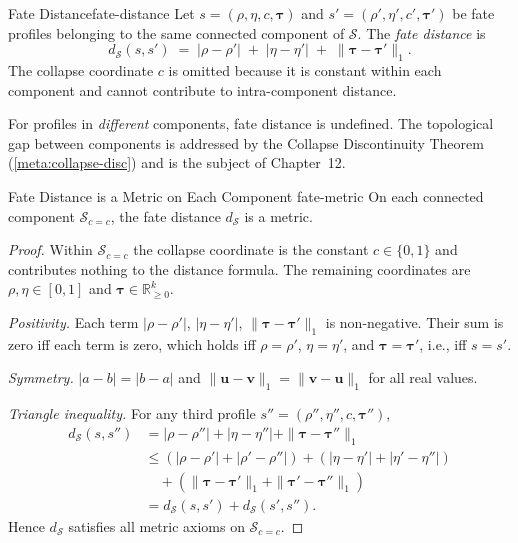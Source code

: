 \documentclass[12pt,twoside,openright]{book}
\newcommand{\fateSpace}{\mathcal{S}}
\newcommand{\survRatio}{\rho}             %
\newcommand{\repEff}{\eta}               %
\newcommand{\collapseInd}{c}             %
\newcommand{\fateDist}[2]{d_{\fateSpace}(#1,#2)}
\newcommand{\fateComp}[1]{\fateSpace_{\collapseInd=#1}}
\providecommand{\fateComp}[1]{\fateSpace_{\collapseInd=#1}}
\providecommand{\fateDist}[2]{d_{\fateSpace}(#1,#2)}
\begin{document}
\begin{definition}{Fate Distance}{fate-distance}
Let $s=(\survRatio,\repEff,\collapseInd,\boldsymbol{\tau})$ and
$s'=(\survRatio',\repEff',\collapseInd',\boldsymbol{\tau}')$ be
fate profiles belonging to the same connected component of
$\fateSpace$.
The \emph{fate distance} is
\[
  \fateDist{s}{s'}
  \;=\;
  |\survRatio-\survRatio'|
  \;+\;
  |\repEff-\repEff'|
  \;+\;
  \|\boldsymbol{\tau}-\boldsymbol{\tau}'\|_{1}.
\]
The collapse coordinate $\collapseInd$ is omitted because it is
constant within each component and cannot contribute to
intra-component distance.

For profiles in \emph{different} components, fate distance is
undefined. The topological gap between components is addressed
by the Collapse Discontinuity Theorem
(\cref{meta:collapse-disc}) and is the subject of
Chapter~12.
\end{definition}

\begin{proposition}{Fate Distance is a Metric on Each Component}%
  {fate-metric}
On each connected component $\fateComp{c}$, the fate distance
$d_{\fateSpace}$ is a metric.
\begin{proof}
Within $\fateComp{c}$ the collapse coordinate is the constant
$c\in\{0,1\}$ and contributes nothing to the distance formula.
The remaining coordinates are $\survRatio,\repEff\in[0,1]$ and
$\boldsymbol{\tau}\in\mathbb{R}_{\ge0}^k$.

\emph{Positivity.} Each term $|\survRatio-\survRatio'|$,
$|\repEff-\repEff'|$, $\|\boldsymbol{\tau}-\boldsymbol{\tau}'\|_1$
is non-negative. Their sum is zero iff each term is zero, which
holds iff $\survRatio=\survRatio'$, $\repEff=\repEff'$, and
$\boldsymbol{\tau}=\boldsymbol{\tau}'$, i.e., iff $s=s'$.

\emph{Symmetry.} $|a-b|=|b-a|$ and $\|\mathbf{u}-\mathbf{v}\|_1
=\|\mathbf{v}-\mathbf{u}\|_1$ for all real values.

\emph{Triangle inequality.} For any third profile
$s''=(\survRatio'',\repEff'',c,\boldsymbol{\tau}'')$,
\begin{align*}
  \fateDist{s}{s''}
  &= |\survRatio-\survRatio''|
     +|\repEff-\repEff''|
     +\|\boldsymbol{\tau}-\boldsymbol{\tau}''\|_1 \\
  &\le
    (|\survRatio-\survRatio'|+|\survRatio'-\survRatio''|)
    +(|\repEff-\repEff'|+|\repEff'-\repEff''|) \\
  &\quad
    +(\|\boldsymbol{\tau}-\boldsymbol{\tau}'\|_1
     +\|\boldsymbol{\tau}'-\boldsymbol{\tau}''\|_1) \\
  &= \fateDist{s}{s'} + \fateDist{s'}{s''}.
\end{align*}
Hence $d_{\fateSpace}$ satisfies all metric axioms on $\fateComp{c}$.
\end{proof}
\end{proposition}
\end{document}
